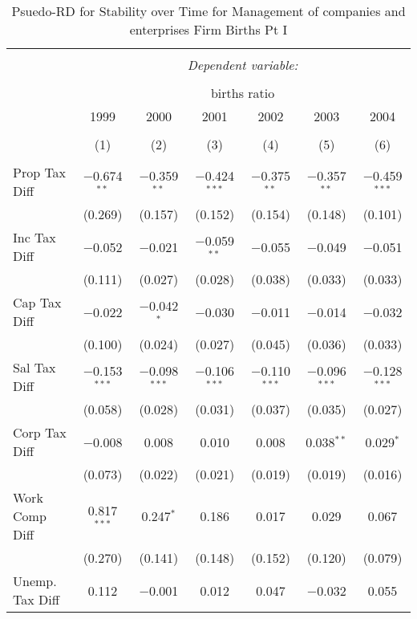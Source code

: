 
\begin{table}[!htbp] \centering 
  \caption{Psuedo-RD for Stability over Time for  Management of companies and enterprises Firm Births Pt I} 
  \label{55year} 
\small 
\begin{tabular}{@{\extracolsep{5pt}}lcccccc} 
\\[-1.8ex]\hline 
\hline \\[-1.8ex] 
 & \multicolumn{6}{c}{\textit{Dependent variable:}} \\ 
\cline{2-7} 
\\[-1.8ex] & \multicolumn{6}{c}{births ratio} \\ 
 & 1999 & 2000 & 2001 & 2002 & 2003 & 2004 \\ 
\\[-1.8ex] & (1) & (2) & (3) & (4) & (5) & (6)\\ 
\hline \\[-1.8ex] 
 Prop Tax Diff & $-$0.674$^{**}$ & $-$0.359$^{**}$ & $-$0.424$^{***}$ & $-$0.375$^{**}$ & $-$0.357$^{**}$ & $-$0.459$^{***}$ \\ 
  & (0.269) & (0.157) & (0.152) & (0.154) & (0.148) & (0.101) \\ 
  Inc Tax Diff & $-$0.052 & $-$0.021 & $-$0.059$^{**}$ & $-$0.055 & $-$0.049 & $-$0.051 \\ 
  & (0.111) & (0.027) & (0.028) & (0.038) & (0.033) & (0.033) \\ 
  Cap Tax Diff & $-$0.022 & $-$0.042$^{*}$ & $-$0.030 & $-$0.011 & $-$0.014 & $-$0.032 \\ 
  & (0.100) & (0.024) & (0.027) & (0.045) & (0.036) & (0.033) \\ 
  Sal Tax Diff & $-$0.153$^{***}$ & $-$0.098$^{***}$ & $-$0.106$^{***}$ & $-$0.110$^{***}$ & $-$0.096$^{***}$ & $-$0.128$^{***}$ \\ 
  & (0.058) & (0.028) & (0.031) & (0.037) & (0.035) & (0.027) \\ 
  Corp Tax Diff & $-$0.008 & 0.008 & 0.010 & 0.008 & 0.038$^{**}$ & 0.029$^{*}$ \\ 
  & (0.073) & (0.022) & (0.021) & (0.019) & (0.019) & (0.016) \\ 
  Work Comp Diff & 0.817$^{***}$ & 0.247$^{*}$ & 0.186 & 0.017 & 0.029 & 0.067 \\ 
  & (0.270) & (0.141) & (0.148) & (0.152) & (0.120) & (0.079) \\ 
  Unemp. Tax Diff & 0.112 & $-$0.001 & 0.012 & 0.047 & $-$0.032 & 0.055 \\ 

\end{tabular}
\end{table}
